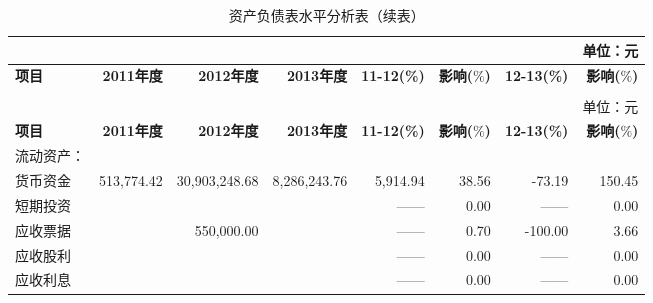 \renewcommand*{\arraystretch}{0.8}
\setlength{\tabcolsep}{5pt}
\begin{longtable}{>{\scriptsize}p{8em}>{\scriptsize}r>{\scriptsize}r>{\scriptsize}r>{\scriptsize}r>{\scriptsize}r>{\scriptsize}r>{\scriptsize}r}
\caption[资产负债表水平分析表]{资产负债表水平分析表}\\  %
&&&&&&& {\scriptsize 单位：元}\\
\hline\hline
\rowcolor{mycyan}	\hspace{3em} \bfseries 项目 	& \bfseries 2011年度\hspace{1em} & \bfseries 2012年度\hspace{1em} 	& \bfseries 2013年度\hspace{1em} &  \bfseries  11-12(\%)  & {\bfseries \scriptsize 影响($\%$)}    & \hspace{1em} \bfseries  12-13(\%) & {\bfseries \scriptsize 影响($\%$)} \\  \endfirsthead          %
\caption[]{资产负债表水平分析表（续表）} \\ 
&&&&&&& {\scriptsize 单位：元}\\                        %
\hline\hline
\rowcolor{mycyan}	\hspace{3em} \bfseries 项目 	& \bfseries 2011年度\hspace{1em} & \bfseries 2012年度\hspace{1em} 	& \bfseries 2013年度\hspace{1em} &  \bfseries  11-12(\%)  & {\bfseries \scriptsize 影响($\%$)}    & \hspace{1em} \bfseries  12-13(\%) & {\bfseries \scriptsize 影响($\%$)} \\  \endhead                %
\hline
\endfoot
\hline   %
流动资产：	&		&		&		&		&		&		&		\\
\hspace{2ex}货币资金	&	513,774.42	&	30,903,248.68	&	8,286,243.76	&	5,914.94	&	38.56	&	-73.19	&	150.45	\\
\hspace{2ex}短期投资	&		&		&		&	——	&	0.00	&	——	&	0.00	\\
\hspace{2ex}应收票据	&		&	550,000.00	&		&	——	&	0.70	&	-100.00	&	3.66	\\
\hspace{2ex}应收股利	&		&		&		&	——	&	0.00	&	——	&	0.00	\\
\hspace{2ex}应收利息	&		&		&		&	——	&	0.00	&	——	&	0.00	\\

\end{longtable}
